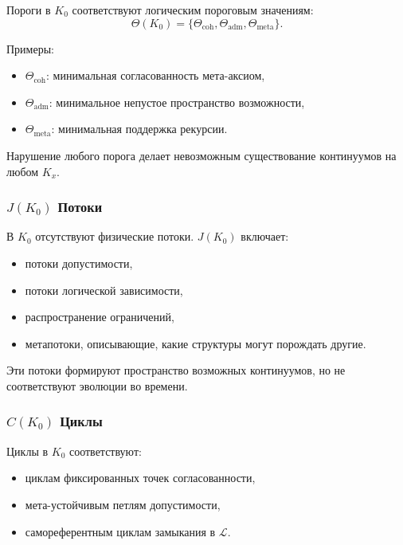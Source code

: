 Пороги в $K_0$ соответствуют логическим пороговым значениям:
\[
\Theta(K_0) = \{ \Theta_{\mathrm{coh}}, \Theta_{\mathrm{adm}},
                 \Theta_{\mathrm{meta}} \}.
\]

Примеры:
\begin{itemize}
    \item $\Theta_{\mathrm{coh}}$: минимальная согласованность мета-аксиом,
    \item $\Theta_{\mathrm{adm}}$: минимальное непустое пространство
          возможности,
    \item $\Theta_{\mathrm{meta}}$: минимальная поддержка рекурсии.
\end{itemize}

Нарушение любого порога делает невозможным существование континуумов на
любом $K_x$.

\subsubsection{\texorpdfstring{$J(K_0)$}{J(K_0)} Потоки}

В $K_0$ отсутствуют физические потоки.
$J(K_0)$ включает:
\begin{itemize}
    \item потоки допустимости,
    \item потоки логической зависимости,
    \item распространение ограничений,
    \item метапотоки, описывающие, какие структуры могут порождать
          другие.
\end{itemize}

Эти потоки формируют пространство возможных континуумов, но не
соответствуют эволюции во времени.

\subsubsection{\texorpdfstring{$C(K_0)$}{C(K_0)} Циклы}

Циклы в $K_0$ соответствуют:
\begin{itemize}
    \item циклам фиксированных точек согласованности,
    \item мета-устойчивым петлям допустимости,
    \item самореферентным циклам замыкания в $\mathcal{L}$.
\end{itemize}

